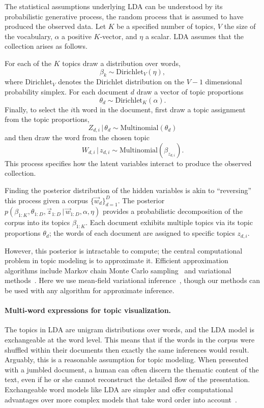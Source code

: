 \documentclass[11pt]{article}
\begin{document}
The statistical assumptions underlying LDA can be understood by its
probabilistic generative process, the random process that is assumed
to have produced the observed data.  Let $K$ be a specified number of
topics, $V$ the size of the vocabulary, $\alpha$ a positive
$K$-vector, and $\eta$ a scalar.  LDA assumes that the collection
arises as follows.

For each of the $K$ topics draw a distribution over words,
\[ \beta_{k} \sim {\textrm{Dirichlet}}_V(\eta), \] where ${\textrm{Dirichlet}}_V$ denotes the
Dirichlet distribution on the $V-1$ dimensional probability simplex.
For each document $d$ draw a vector of topic proportions
\[\theta_{d} \sim {\textrm{Dirichlet}}_K(\alpha).\]
Finally, to select the $i$th word in the document, first draw a topic
assignment from the topic proportions,
\[Z_{d,i} {\,|\,} \theta_d \sim {\textrm{Multinomial}}(\theta_{d})\] and then draw the word
from the chosen topic
\[W_{d,i} {\,|\,} z_{d,i} \sim {\textrm{Multinomial}}(\beta_{z_{d,i}}).\] This process
specifies how the latent variables interact to produce the observed
collection.

Finding the posterior distribution of the hidden variables is akin to
``reversing'' this process given a corpus $\{\vec{w}_d\}_{d=1}^{D}$.
The posterior $p(\beta_{1:K}, \theta_{1:D}, \vec{z}_{1:D} {\,|\,}
\vec{w}_{1:D}, \alpha, \eta)$ provides a probabilistic decomposition
of the corpus into its topics $\beta_{1:K}$.  Each document exhibits
multiple topics via its topic proportions $\theta_d$; the words of
each document are assigned to specific topics $z_{d,i}$.

However, this posterior is intractable to compute; the central
computational problem in topic modeling is to approximate it.
Efficient approximation algorithms include Markov chain Monte Carlo
sampling~\citep{Griffiths:2006} and variational
methods~\citep{Minka:2002,Blei:2003b,Teh:2006}.  Here we use
mean-field variational inference~\citep{Blei:2003b}, though our
methods can be used with any algorithm for approximate inference.

\paragraph{Multi-word expressions for topic visualization.}
\label{sec:strategy}

The topics in LDA are unigram distributions over words, and the LDA
model is exchangeable at the word level.  This means that if the words
in the corpus were shuffled within their documents then exactly the
same inferences would result.  Arguably, this is a reasonable
assumption for topic modeling.  When presented with a jumbled
document, a human can often discern the thematic content of the text,
even if he or she cannot reconstruct the detailed flow of the
presentation.  Exchangeable word models like LDA are simpler and offer
computational advantages over more complex models that take word order
into account~\citep{Girolami:2004,Wallach:2006,Wang:2007}.
\end{document}
